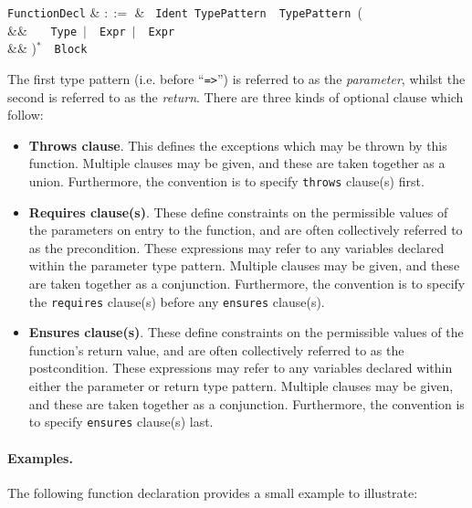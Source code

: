 \begin{syntax}
  \verb+FunctionDecl+ & $::=$ & \ \verb+Ident+\
  \verb+TypePattern+\ \token{=>}\ \verb+TypePattern+\ \big(\\
  && \ \ \ \verb+Type+\ $|$\ \
  \verb+Expr+\ $|$\ \ \verb+Expr+\\
  && \big)$^*$\ \token{:}\ \verb+Block+\\
\end{syntax}

The first type pattern (i.e. before ``\lstinline{=>}'') is referred to as the {\em parameter}, whilst the second is referred to as the {\em return}.  There are three kinds of optional clause which follow:

\begin{itemize}
\item {\bf Throws clause}. This defines the exceptions which may be thrown by this function. Multiple clauses may be given, and these are taken together as a union. Furthermore, the convention is to specify \lstinline{throws} clause(s) first.

\item {\bf Requires clause(s)}. These define constraints on the permissible values of the parameters on entry to the function, and are often collectively referred to as the \gls{precondition}. These expressions may refer to any variables declared within the parameter type pattern. Multiple clauses may be given, and these are taken together as a conjunction. Furthermore, the convention is to specify the \lstinline{requires} clause(s) before any \lstinline{ensures} clause(s).

\item {\bf Ensures clause(s)}. These define constraints on the permissible values of the function's return value, and are often collectively referred to as the \gls{postcondition}. These expressions may refer to any variables declared within either the parameter or return type pattern.  Multiple clauses may be given, and these are taken together as a conjunction. Furthermore, the convention is to specify \lstinline{ensures} clause(s) last.
\end{itemize}

\paragraph{Examples.}
The following function declaration provides a small example to
illustrate:

